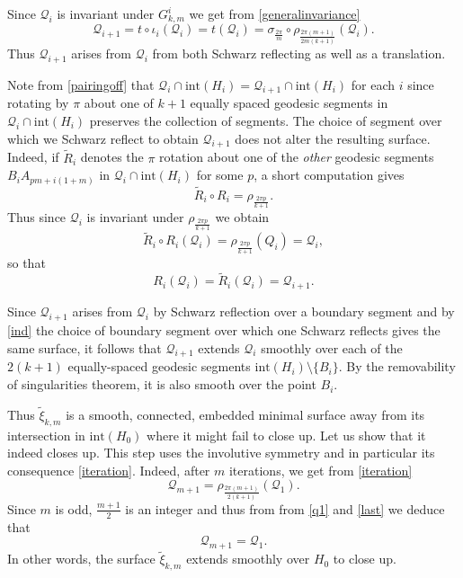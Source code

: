 \documentclass[11pt, reqno]{amsart}
\numberwithin{equation}{section}
\begin{document}
Since $\mathcal{Q}_i$ is invariant under $G_{k,m}^i$ we get from \eqref{generalinvariance}
\begin{equation}\label{iteration}
\mathcal{Q}_{i+1} = t\circ\iota_i (\mathcal{Q}_i)= t(\mathcal{Q}_i)= \sigma_{\frac{2\pi}{m}}\circ \rho_{\frac{2\pi (m+1)}{2m(k+1)}}(\mathcal{Q}_i).
\end{equation}
\noindent
Thus $\mathcal{Q}_{i+1}$ arises from $\mathcal{Q}_i$ from both Schwarz reflecting as well as a translation.  

Note from \eqref{pairingoff} that $\mathcal{Q}_i\cap\mbox{int}(H_i)=\mathcal{Q}_{i+1}\cap\mbox{int}(H_i)$ for each $i$ since rotating by $\pi$ about one of $k+1$ equally spaced geodesic segments in $\mathcal{Q}_i\cap\mbox{int}(H_i)$ preserves the collection of segments.  The choice of segment over which we Schwarz reflect to obtain $\mathcal{Q}_{i+1}$ does not alter the resulting surface.  Indeed, if $\tilde{R}_i$ denotes the $\pi$ rotation about one of the \emph{other} geodesic segments $B_iA_{pm+i(1+m)}$
in $\mathcal{Q}_i\cap\mbox{int}(H_i)$ for some $p$, a short computation gives
\begin{equation}
\tilde{R}_i\circ R_i = \rho_{\frac{2\pi p}{k+1}}.
\end{equation}
Thus since $\mathcal{Q}_i$ is invariant under $ \rho_{\frac{2\pi p}{k+1}}$ we obtain
\begin{equation}
\tilde{R}_i\circ R_i(\mathcal{Q}_i)=\rho_{\frac{2\pi p}{k+1}}(\mathcal{}Q_i)=\mathcal{Q}_i, 
\end{equation}
so that
\begin{equation}\label{ind}
R_i(\mathcal{Q}_i)=\tilde{R}_i(\mathcal{Q}_i)=\mathcal{Q}_{i+1}.
\end{equation}



Since $\mathcal{Q}_{i+1}$ arises from $\mathcal{Q}_i$ by Schwarz reflection over a boundary segment and by \eqref{ind} the choice of boundary segment over which one Schwarz reflects gives the same surface, it follows that $\mathcal{Q}_{i+1}$ extends $\mathcal{Q}_i$ smoothly over each of the $2(k+1)$ equally-spaced geodesic segments $\mbox{int}(H_i)\setminus \{B_i\}$.  By the removability of singularities theorem, it is also smooth over the point $B_i$. 

Thus $\tilde{\xi}_{k,m}$ is a smooth, connected, embedded minimal surface away from its intersection in $\mbox{int}(H_0)$ where it might fail to close up.  Let us show that it indeed closes up.  This step uses the involutive symmetry and in particular its consequence \eqref{iteration}.  Indeed, after $m$ iterations, we get from \eqref{iteration}
\begin{equation}\label{last}
\mathcal{Q}_{m+1}=\rho_{\frac{2\pi(m+1)}{2(k+1)}}(\mathcal{Q}_1).
\end{equation}
Since $m$ is odd, $\frac{m+1}{2}$ is an integer and thus from from \eqref{q1} and \eqref{last} we deduce that
\begin{equation}
\mathcal{Q}_{m+1}=\mathcal{Q}_1.
\end{equation}
In other words, the surface $\tilde{\xi}_{k,m}$ extends smoothly over $H_0$ to close up.
\end{document}
